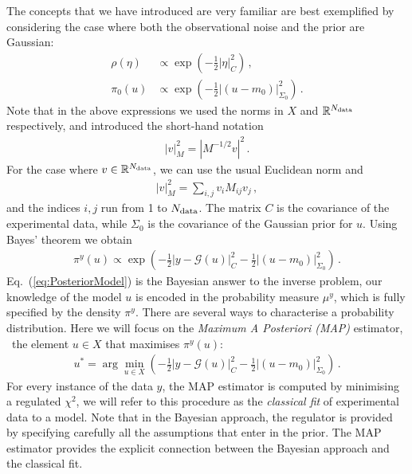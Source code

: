 The concepts that we have introduced are very familiar are best exemplified
by considering the case where both the observational noise and the
prior are Gaussian:
\begin{align}
  \label{eq:RhoGauss}
  \rho(\eta) &\propto \exp\left(
               -\frac12 \left|\eta\right|_C^2
               \right)\, , \\
  \label{eq:PiZeroGauss}
  \pi_0(u)  &\propto \exp\left(
              -\frac12 \left|(u-m_0)\right|_{\Sigma_0}^2
              \right)\, .
\end{align}
Note that in the above expressions we used the norms in $X$ and
$\mathbb{R}^{N_{\rm data}}$ respectively, and introduced the short-hand
notation
\begin{align}
  \left|v\right|_M^2 = \left| M^{-1/2} v\right|^2\, .
\end{align}
For the case where $v \in \mathbb{R}^{N_{\rm data}}$, we can use the usual
Euclidean norm  and
\begin{align}
  \left|v\right|_M^2 = \sum_{i,j} v_i M_{ij} v_j\, ,
\end{align}
and the indices $i,j$ run from 1 to $N_{\rm data}$.  The matrix $C$ is the
covariance of the experimental data, while $\Sigma_0$ is the
covariance of the Gaussian prior for $u$. Using Bayes' theorem we
obtain
\begin{align}
  \label{eq:PosteriorModel}
  \pi^y(u) \propto 
  \exp\left(
  -\frac12 \left|y - \mathcal G(u)\right|_C^2
  -\frac12 \left|(u-m_0)\right|_{\Sigma_0}^2
  \right)\, .
\end{align}
Eq.~(\ref{eq:PosteriorModel}) is the Bayesian answer to the inverse
problem, our knowledge of the model $u$ is encoded in the probability
measure $\mu^y$, which is fully specified by the density
$\pi^y$. There are several ways to characterise a probability
distribution. Here we will focus on the {\em Maximum A Posteriori
  (MAP)} estimator, \ie\ the element $u \in X$ that maximises
$\pi^y(u)$:
\begin{align}
  u^* = \arg\min_{u \in X} 
  \left(
  -\frac12 \left|y - \mathcal G(u)\right|_C^2
  -\frac12 \left|(u-m_0)\right|_{\Sigma_0}^2
  \right)\, .
\end{align}
For every instance of the data $y$, the MAP estimator is computed by
minimising a regulated $\chi^2$, we will refer to this procedure as
the {\em classical fit} of experimental data to a model. Note that in
the Bayesian approach, the regulator is provided by specifying
carefully all the assumptions that enter in the prior. The MAP
estimator provides the explicit connection between the Bayesian
approach and the classical fit.

